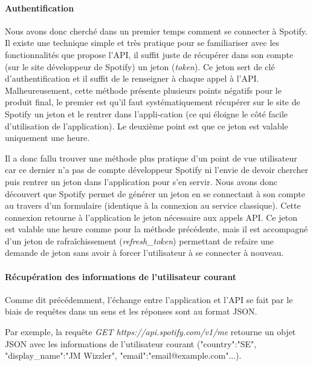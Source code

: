 \documentclass{article}
\begin{document}
		\paragraph{Authentification}\mbox{}
								
		Nous avons donc cherché dans un premier temps comment se connecter à Spotify. Il existe une technique simple et très pratique pour se familiariser avec les fonctionnalités que propose l'API, il suffit juste de récupérer dans son compte (sur le site développeur de Spotify) un jeton (\textit{token}). Ce jeton sert de clé d'authentification et il suffit de le renseigner à chaque appel à l'API. Malheureusement, cette méthode présente plusieurs points négatifs pour le produit final, le premier est qu'il faut systématiquement récupérer sur le site de Spotify un jeton et le rentrer dans l'appli-\newline cation (ce qui éloigne le côté facile d'utilisation de l'application). Le deuxième point est que ce jeton est valable uniquement une heure.
								
		Il a donc fallu trouver une méthode plus pratique d'un point de vue utilisateur car ce dernier n'a pas de compte développeur Spotify ni l'envie de devoir chercher puis rentrer un jeton dans l'application pour s'en servir. Nous avons donc découvert que Spotify permet de générer un jeton en se connectant à son compte au travers d'un formulaire (identique à la connexion au service classique). Cette connexion retourne à l'application le jeton nécessaire aux appels API. Ce jeton est valable une heure comme pour la méthode précédente, mais il est accompagné d'un jeton de rafraîchissement (\textit{refresh\_token}) permettant de refaire une demande de jeton sans avoir à forcer l'utilisateur à se connecter à nouveau.
								
		\paragraph{Récupération des informations de l'utilisateur courant}\mbox{}
								
		Comme dit précédemment, l'échange entre l'application et l'API se fait par le biais de requêtes dans un sens et les réponses sont au format JSON.
								
		Par exemple, la requête \textit{GET https://api.spotify.com/v1/me} retourne un objet JSON avec les informations de l'utilisateur courant ("country":"SE", "display\_name":"JM Wizzler", "email":"email@example.com"...).
								
\end{document}
